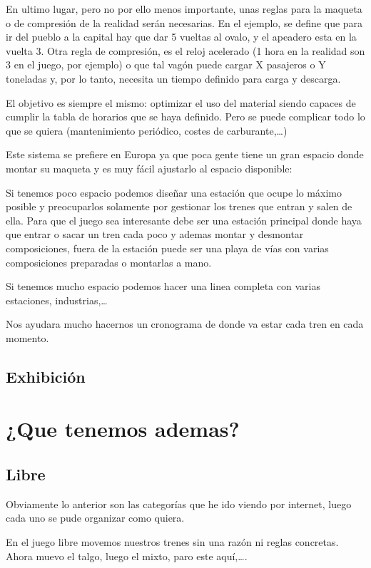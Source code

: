 En ultimo lugar, pero no por ello menos importante, unas reglas para la maqueta o de compresión de la realidad serán necesarias. En el ejemplo, se define que para ir del pueblo a la capital hay que dar 5 vueltas al ovalo, y el apeadero esta en la vuelta 3. Otra regla de compresión, es el reloj acelerado (1 hora en la realidad son 3 en el juego, por ejemplo) o que tal vagón puede cargar X pasajeros o Y toneladas y, por lo tanto, necesita un tiempo definido para carga y descarga.

El objetivo es siempre el mismo: optimizar el uso del material siendo capaces de cumplir la tabla de horarios que se haya definido. Pero se puede complicar todo lo que se quiera (mantenimiento periódico, costes de carburante,…)

Este sistema se prefiere en Europa ya que poca gente tiene un gran espacio donde montar su maqueta y es muy fácil ajustarlo al espacio disponible:

Si tenemos poco espacio podemos diseñar una estación que ocupe lo máximo posible y preocuparlos solamente por gestionar los trenes que entran y salen de ella. Para que el juego sea interesante debe ser una estación principal donde haya que entrar o sacar un tren cada poco y ademas montar y desmontar composiciones, fuera de la estación puede ser una playa de vías con varias composiciones preparadas o montarlas a mano.

Si tenemos mucho espacio podemos hacer una linea completa con varias estaciones, industrias,…

Nos ayudara mucho hacernos un cronograma de donde va estar cada tren en cada momento.

\subsection{Exhibición}

\section{¿Que tenemos ademas?}

\subsection{Libre}
Obviamente lo anterior son las categorías que he ido viendo por internet, luego cada uno se pude organizar como quiera.

En el juego libre movemos nuestros trenes sin una razón ni reglas concretas. Ahora muevo el talgo, luego el mixto, paro este aquí,….

